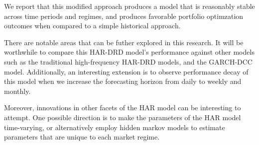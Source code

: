 \documentclass{article}
\begin{document}
We report that this modified approach produces a model that is reasonably stable across time periods 
and regimes, and produces favorable portfolio optimzation outcomes when compared to a simple
historical approach.

There are notable areas that can be futher explored in this research. It will be worthwhile to compare
this HAR-DRD model's performance against other models such as the traditional high-frequency HAR-DRD models,
and the GARCH-DCC model. Additionally, an interesting extension is to observe performance decay of this model
when we increase the forecasting horizon from daily to weekly and monthly. 

Moreover, innovations in other facets of the HAR model can be interesting to attempt. One possible direction
is to make the parameters of the HAR model time-varying, or alternatively employ hidden markov models to 
estimate parameters that are unique to each market regime. 
\newpage


\end{document}
